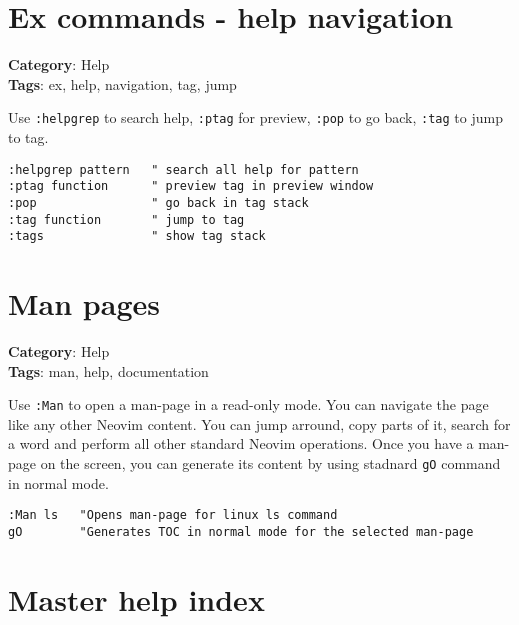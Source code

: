 {{{{{{\section{Ex commands - help navigation}

\textbf{Category}: Help\\ \textbf{Tags}: ex, help, navigation, tag, jump
\vspace{0.5cm}

Use {\footnotesize \Verb§:helpgrep§} to search help, {\footnotesize \Verb§:ptag§} for preview, {\footnotesize \Verb§:pop§} to go back, {\footnotesize \Verb§:tag§} to jump to tag.

\begin{Exa*}{}
\begin{Verbatim}[fontsize=\footnotesize, breaklines, breakanywhere]
:helpgrep pattern   " search all help for pattern
:ptag function      " preview tag in preview window
:pop                " go back in tag stack
:tag function       " jump to tag
:tags               " show tag stack
\end{Verbatim}
\end{Exa*}

\section{Man pages}

\textbf{Category}: Help\\ \textbf{Tags}: man, help, documentation
\vspace{0.5cm}

Use {\footnotesize \Verb§:Man§} to open a man-page in a read-only mode. You can navigate the page like any other Neovim content. You can jump arround, copy parts of it, search for a word and perform all other standard Neovim operations. Once you have a man-page on the screen, you can generate its content by using stadnard {\footnotesize \Verb§gO§} command in normal mode.

\begin{Exa*}{}
\begin{Verbatim}[fontsize=\footnotesize, breaklines, breakanywhere]
:Man ls   "Opens man-page for linux ls command
gO        "Generates TOC in normal mode for the selected man-page
\end{Verbatim}
\end{Exa*}

\section{Master help index}

}}}}}}
